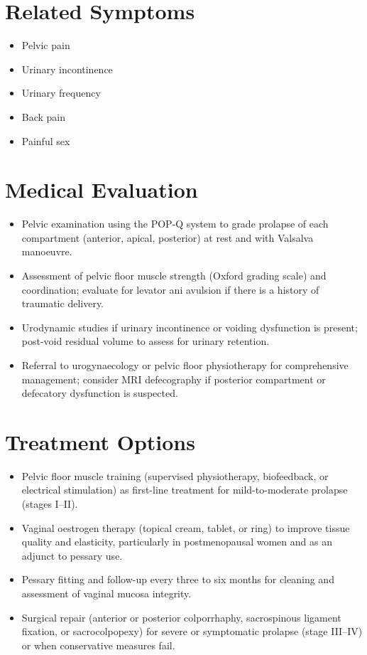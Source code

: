 \section*{Related Symptoms}
\begin{itemize}
  \item Pelvic pain
  \item Urinary incontinence
  \item Urinary frequency
  \item Back pain
  \item Painful sex
\end{itemize}


\section*{Medical Evaluation}
\begin{itemize}
  \item Pelvic examination using the POP-Q system to grade prolapse of each compartment (anterior, apical, posterior) at rest and with Valsalva manoeuvre.
  \item Assessment of pelvic floor muscle strength (Oxford grading scale) and coordination; evaluate for levator ani avulsion if there is a history of traumatic delivery.
  \item Urodynamic studies if urinary incontinence or voiding dysfunction is present; post-void residual volume to assess for urinary retention.
  \item Referral to urogynaecology or pelvic floor physiotherapy for comprehensive management; consider MRI defecography if posterior compartment or defecatory dysfunction is suspected.
\end{itemize}

\section*{Treatment Options}
\begin{itemize}
  \item Pelvic floor muscle training (supervised physiotherapy, biofeedback, or electrical stimulation) as first-line treatment for mild-to-moderate prolapse (stages I--II).
  \item Vaginal oestrogen therapy (topical cream, tablet, or ring) to improve tissue quality and elasticity, particularly in postmenopausal women and as an adjunct to pessary use.
  \item Pessary fitting and follow-up every three to six months for cleaning and assessment of vaginal mucosa integrity.
  \item Surgical repair (anterior or posterior colporrhaphy, sacrospinous ligament fixation, or sacrocolpopexy) for severe or symptomatic prolapse (stage III--IV) or when conservative measures fail.
\end{itemize}

